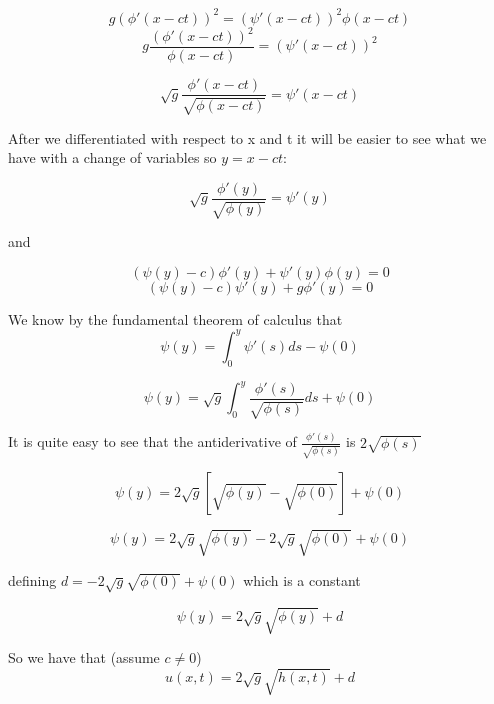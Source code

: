 \documentclass[12pt]{article}
\begin{document}
\[g \left(\phi'(x - ct)\right)^2 = \left(\psi'(x - ct)\right)^2\phi(x - ct)\]
\[g \frac{\left(\phi'(x - ct)\right)^2}{\phi(x - ct)} = \left(\psi'(x - ct)\right)^2\]

\[\sqrt{g} \frac{\phi'(x - ct)}{\sqrt{\phi(x - ct)}} = \psi'(x - ct)\]

After we differentiated with respect to x and t it will be easier to see what we have with a change of variables so $y = x - ct$:

\[\sqrt{g} \frac{\phi'(y)}{\sqrt{\phi(y)}} = \psi'(y)\]

and 

\begin{equation}
\label{expconeqy}
\left(\psi(y) -c\right)\phi'(y) + \psi'(y)\phi(y) = 0
\end{equation}
\begin{equation}
\label{expveleqy}
\left(\psi(y) -c\right)\psi'(y) + g\phi'(y) = 0
\end{equation}

We know by the fundamental theorem of calculus that
\[\psi(y) = \int_0^y \psi'(s) ds - \psi(0)\]

\[\psi(y) = \sqrt{g} \int_0^y \frac{\phi'(s)}{\sqrt{\phi(s)}} ds + \psi(0)\]

It is quite easy to see that the antiderivative of $\frac{\phi'(s)}{\sqrt{\phi(s)}}$  is $2\sqrt{\phi(s)}$

\[\psi(y) = 2\sqrt{g} \left[\sqrt{\phi(y)} - \sqrt{\phi(0)}\right] + \psi(0)\]

\[\psi(y) = 2\sqrt{g}\sqrt{\phi(y)} - 2\sqrt{g}\sqrt{\phi(0)} + \psi(0)\]

defining $d =- 2\sqrt{g}\sqrt{\phi(0)} + \psi(0)$ which is a constant

\[\psi(y) = 2\sqrt{g}\sqrt{\phi(y)} + d\]

So we have that (assume $c \neq 0$)
\begin{equation}
\label{relation}
u(x,t) = 2\sqrt{g}\sqrt{h(x,t)} + d  
\end{equation}
\end{document}
